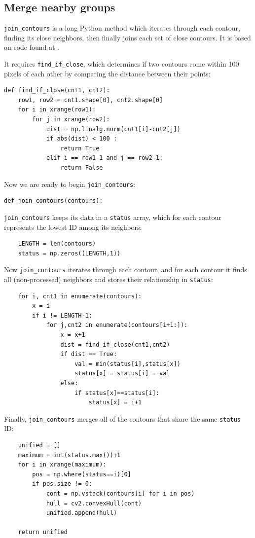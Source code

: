 \documentclass[notitlepage,12pt]{article}
\newcommand{\mycite}[1]{\cite{#1}}
\begin{document}
\subsection{Merge nearby groups}

\texttt{join\_contours} is a long Python method which iterates through each contour, finding its close neighbors, then finally joins each set of close contours.  It is based on code found at \mycite{join}.


It requires \texttt{find\_if\_close}, which determines if two contours come within 100 pixels of each other by comparing the distance between their points:
\begin{lstlisting}
def find_if_close(cnt1, cnt2):
    row1, row2 = cnt1.shape[0], cnt2.shape[0]
    for i in xrange(row1):
        for j in xrange(row2):
            dist = np.linalg.norm(cnt1[i]-cnt2[j])
            if abs(dist) < 100 :
                return True
            elif i == row1-1 and j == row2-1:
                return False
\end{lstlisting}

Now we are ready to begin \texttt{join\_contours}:
\begin{lstlisting}
def join_contours(contours):
\end{lstlisting}

\texttt{join\_contours} keeps its data in a \texttt{status} array, which for each contour represents the lowest ID among its neighbors:
\begin{lstlisting}
    LENGTH = len(contours)
    status = np.zeros((LENGTH,1))
\end{lstlisting}

Now \texttt{join\_contours} iterates through each contour, and for each contour it finds all (non-processed) neighbors and stores their relationship in \texttt{status}:
\begin{lstlisting}
    for i, cnt1 in enumerate(contours):
        x = i    
        if i != LENGTH-1:
            for j,cnt2 in enumerate(contours[i+1:]):
                x = x+1
                dist = find_if_close(cnt1,cnt2)
                if dist == True:
                    val = min(status[i],status[x])
                    status[x] = status[i] = val
                else:
                    if status[x]==status[i]:
                        status[x] = i+1
\end{lstlisting}

Finally, \texttt{join\_contours} merges all of the contours that share the same \texttt{status} ID:
\begin{lstlisting}
    unified = []
    maximum = int(status.max())+1
    for i in xrange(maximum):
        pos = np.where(status==i)[0]
        if pos.size != 0:
            cont = np.vstack(contours[i] for i in pos)
            hull = cv2.convexHull(cont)
            unified.append(hull)

    return unified
\end{lstlisting}
\end{document}
